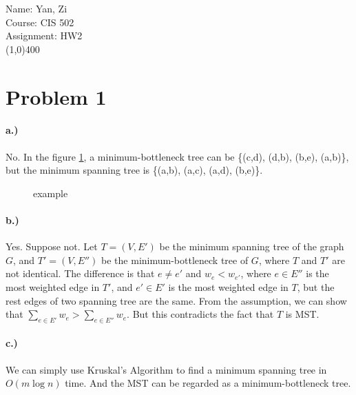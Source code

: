 \documentclass[a4paper,12pt]{article}
\begin{document}
Name: Yan, Zi \\
Course: CIS 502 \\
Assignment: HW2 \\
\line(1,0){400}


\section*{Problem 1}
\paragraph*{a.)}
No.
In the figure \ref{p1a}, a minimum-bottleneck tree can be \{(c,d), (d,b),
(b,e), (a,b)\}, but the minimum spanning tree is \{(a,b), (a,c), (a,d),
(b,e)\}. 

\begin{figure}[!h]
\caption{example}
\label{p1a}
\center
{}
\end{figure}

\paragraph*{b.)}
Yes.
Suppose not. Let $T=(V, E')$ be the minimum spanning tree of the 
graph $G$, and $T'=(V, E'')$ be the minimum-bottleneck tree of $G$,
where $T$ and $T'$ are not identical. The difference is that $e \neq e'$
and $w_e < w_{e'}$, where $e \in E''$ is the most weighted edge in $T'$,
and $e' \in E'$ is the most weighted edge in $T$, but the rest edges of
two spanning tree are the same. From the assumption, we can show
that $\sum\limits_{e \in E'} w_e > \sum\limits_{e \in E''} w_e$. But this 
contradicts the fact that $T$ is MST.

\paragraph*{c.)} We can simply use Kruskal's Algorithm to find a 
minimum spanning tree in $O(m\log n)$ time. And the MST can be
regarded as a minimum-bottleneck tree.
\end{document}
